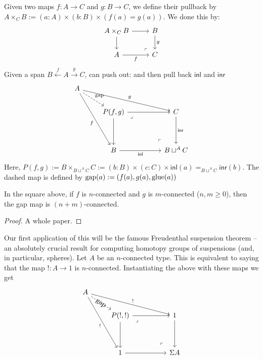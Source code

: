 \documentclass[10pt,oneside,leqno,openright]{memoir}
\begin{document}
Given two maps $f : A \to C$ and $g : B \to C$, we define their pullback by $A \times_C B := (a:A) \times (b:B) \times (f(a) = g(a))$. We done this by:
\[\begin{tikzcd}[ampersand replacement=\&]
	{A \times_CB} \& B \\
	A \& C
	\arrow[from=1-1, to=1-2]
	\arrow[from=1-1, to=2-1]
	\arrow["g", from=1-2, to=2-2]
	\arrow["f"', from=2-1, to=2-2]
	\arrow["\lrcorner"{anchor=center, pos=0.125, rotate=180}, draw=none, from=2-2, to=1-1]
\end{tikzcd}\]
Given a span $B \xleftarrow{f} A \xrightarrow{g} C$, can push out:
%
and then pull back $\mathsf{inl}$ and $\mathsf{inr}$ 
\[\begin{tikzcd}[ampersand replacement=\&]
	A \&\&\& \\
	\& {P(f,g)} \&\& C \\
	\\
	\& B \&\& {B\sqcup^A C}
	\arrow["\gap",dashed, from=1-1, to=2-2]
	\arrow["g", from=1-1, to=2-4]
	\arrow["f"', from=1-1, to=4-2]
	\arrow[from=2-2, to=2-4]
	\arrow[from=2-2, to=4-2]
	\arrow["\lrcorner"{anchor=center, pos=0.125}, shift left=3, draw=none, from=2-2, to=4-4]
	\arrow["{\mathsf{inr}}", from=2-4, to=4-4]
	\arrow["{\mathsf{inl}}"', from=4-2, to=4-4]
	\arrow["\lrcorner"{anchor=center, pos=0.125, rotate=180}, draw=none, from=4-4, to=2-2]
\end{tikzcd}\]
Here, $P(f,g):= B \times_{B\sqcup^A C} C := (b : B) \times (c:C)
\times \mathsf{inl}(a) =_{B\sqcup^A C} \mathsf{inr}(b)$.
%
The dashed map is defined by $\operatorname{gap}(a) := (f(a),g(a),\operatorname{glue}(a))$
%
\begin{theorem}
In the square above, if $f$ is $n$-connected and $g$ is $m$-connected ($n,m \geq 0$), then the gap map is $(n+m)$-connected.
\end{theorem}
\begin{proof}
  A whole paper. \qedhere
\end{proof}
Our first application of this will be the famous Freudenthal suspension theorem -- an absolutely crucial result for computing homotopy groups of suspensions (and, in particular, spheres). Let $A$ be an $n$-connected type. This is equivalent to saying that the map $! : A \to 1$ is $n$-connected. Instantiating the above with these maps we get
%
\[\begin{tikzcd}[ampersand replacement=\&]
	A \&\&\& \\
	\& {P(!,!)} \&\& 1 \\
	\\
	\& 1 \&\& {\Sigma A}
	\arrow["\gap"{marking, allow upside down}, dashed, from=1-1, to=2-2]
	\arrow["{!}", from=1-1, to=2-4]
	\arrow["{!}"', from=1-1, to=4-2]
	\arrow[from=2-2, to=2-4]
	\arrow[from=2-2, to=4-2]
	\arrow["\lrcorner"{anchor=center, pos=0.125}, shift left=3, draw=none, from=2-2, to=4-4]
	\arrow[from=2-4, to=4-4]
	\arrow[from=4-2, to=4-4]
	\arrow["\lrcorner"{anchor=center, pos=0.125, rotate=180}, draw=none, from=4-4, to=2-2]
\end{tikzcd}\]
\end{document}
